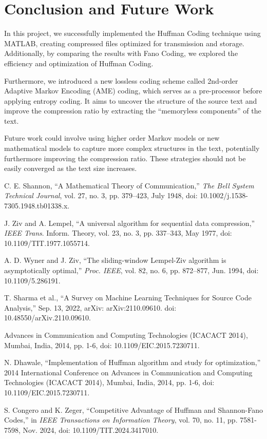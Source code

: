 \documentclass[12pt,twoside]{article}
\begin{document}
\section{Conclusion and Future Work}

In this project, we successfully implemented the Huffman Coding technique using MATLAB, creating compressed files optimized for transmission and storage. Additionally, by comparing the results with Fano Coding, we explored the efficiency and optimization of Huffman Coding.

Furthermore, we introduced a new lossless coding scheme called 2nd-order Adaptive Markov Encoding (AME) coding, which serves as a pre-processor before applying entropy coding. It aims to uncover the structure of the source text and improve the compression ratio by extracting the ``memoryless components'' of the text. 

Future work could involve using higher order Markov models or new mathematical models to capture more complex structures in the text, potentially furthermore improving the compression ratio. These strategies should not be easily converged as the text size increases.



\begin{thebibliography}{9}
     C. E. Shannon, ``A Mathematical Theory of Communication,'' \textit{The Bell System Technical Journal}, vol. 27, no. 3, pp. 379–423, July 1948, doi: 10.1002/j.1538-7305.1948.tb01338.x.

     J. Ziv and A. Lempel, “A universal algorithm for sequential data compression,” \textit{IEEE Trans}. Inform. Theory, vol. 23, no. 3, pp. 337–343, May 1977, doi: 10.1109/TIT.1977.1055714.

     A. D. Wyner and J. Ziv, “The sliding-window Lempel-Ziv algorithm is asymptotically optimal,” \textit{Proc. IEEE}, vol. 82, no. 6, pp. 872–877, Jun. 1994, doi: 10.1109/5.286191.

     T. Sharma et al., ``A Survey on Machine Learning Techniques for Source Code Analysis,'' Sep. 13, 2022, arXiv: arXiv:2110.09610. doi: 10.48550/arXiv.2110.09610.

     Advances in Communication and Computing Technologies (ICACACT 2014), Mumbai, India, 2014, pp. 1-6, doi: 10.1109/EIC.2015.7230711.

     N. Dhawale, ``Implementation of Huffman algorithm and study for optimization,'' 2014 International Conference on Advances in Communication and Computing Technologies (ICACACT 2014), Mumbai, India, 2014, pp. 1-6, doi: 10.1109/EIC.2015.7230711.

     S. Congero and K. Zeger, ``Competitive Advantage of Huffman and Shannon-Fano Codes,'' in \textit{IEEE Transactions on Information Theory}, vol. 70, no. 11, pp. 7581-7598, Nov. 2024, doi: 10.1109/TIT.2024.3417010.




\end{thebibliography}
\end{document}

